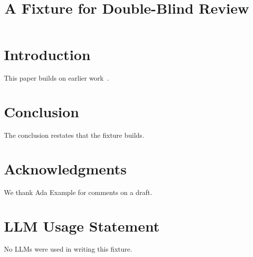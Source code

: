 \documentclass[conference,compsoc]{IEEEtran}
\begin{document}
\title{A Fixture for Double-Blind Review}
\author{}
\maketitle
\section{Introduction}
This paper builds on earlier work~\cite{knuth84}.

\section{Conclusion}
The conclusion restates that the fixture builds.
\section*{Acknowledgments}
We thank Ada Example for comments on a draft.


\section*{LLM Usage Statement}
No LLMs were used in writing this fixture.
\end{document}

